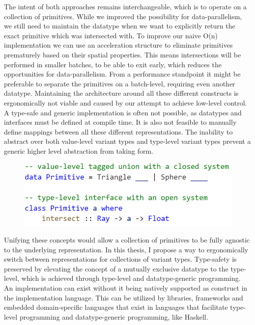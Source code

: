 \documentclass{article}
\newcommand{\type}[1]{\smash{\colorbox{codegray}{\texttt{#1}}}}
\begin{document}
The intent of both approaches remains interchangeable, which is to operate on a collection of primitives.
While we improved the possibility for data-parallelism, we still need to maintain the \type{Primitive} datatype when we want to explicitly return the exact primitive which was intersected with.
To improve our naive O(n) implementation we can use an acceleration structure to eliminate primitives prematurely based on their spatial properties.
This means intersections will be performed in smaller batches, to be able to exit early, which reduces the opportunities for data-parallelism.
From a performance standpoint it might be preferable to separate the primitives on a batch-level, requiring even another datatype.
Maintaining the architecture around all these different constructs is ergonomically not viable and caused by our attempt to achieve low-level control.  
A type-safe and generic implementation is often not possible, as datatypes and interfaces must be defined at compile time.
It is also not feasible to manually define mappings between all these different representations.
The inability to abstract over both value-level variant types and type-level variant types prevent a generic higher level abstraction from taking form.

\begin{figure}[ht]
    \hspace{1em}
    \includegraphics[scale=0.45]{CodeIntro4.png}
\end{figure}

Unifying these concepts would allow a collection of primitives to be fully agnostic to the underlying representation.
In this thesis, I propose a way to ergonomically switch between representations for collections of variant types.
Type-safety is preserved by elevating the concept of a mutually exclusive datatype to the type-level, which is achieved through type-level and datatype-generic programming.
An implementation can exist without it being natively supported as construct in the implementation language.
This can be utilized by libraries, frameworks and embedded domain-specific languages that exist in languages that facilitate type-level programming and datatype-generic programming, like Haskell.
\end{document}
